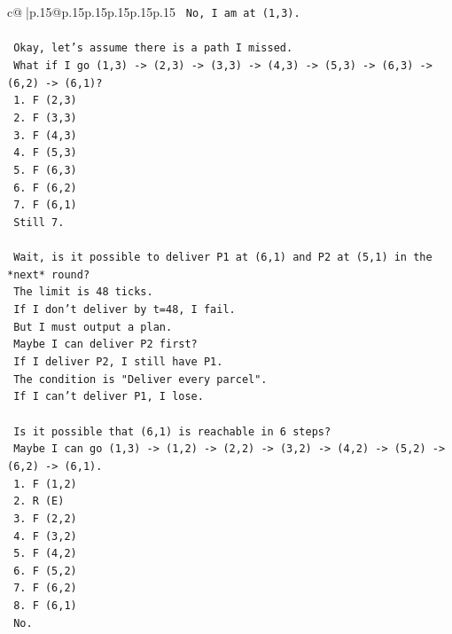 \documentclass{article}
\begin{document}
{\begin{supertabular}{c@{$\;$}|p{.15\linewidth}@{}p{.15\linewidth}p{.15\linewidth}p{.15\linewidth}p{.15\linewidth}p{.15\linewidth}}
{{{\texttt{   No, I am at (1,3).} \\
\\ 
\texttt{   Okay, let's assume there is a path I missed.} \\
\texttt{   What if I go (1,3) {-}> (2,3) {-}> (3,3) {-}> (4,3) {-}> (5,3) {-}> (6,3) {-}> (6,2) {-}> (6,1)?} \\
\texttt{   1. F (2,3)} \\
\texttt{   2. F (3,3)} \\
\texttt{   3. F (4,3)} \\
\texttt{   4. F (5,3)} \\
\texttt{   5. F (6,3)} \\
\texttt{   6. F (6,2)} \\
\texttt{   7. F (6,1)} \\
\texttt{   Still 7.} \\
\\ 
\texttt{   Wait, is it possible to deliver P1 at (6,1) and P2 at (5,1) in the *next* round?} \\
\texttt{   The limit is 48 ticks.} \\
\texttt{   If I don't deliver by t=48, I fail.} \\
\texttt{   But I must output a plan.} \\
\texttt{   Maybe I can deliver P2 first?} \\
\texttt{   If I deliver P2, I still have P1.} \\
\texttt{   The condition is "Deliver every parcel".} \\
\texttt{   If I can't deliver P1, I lose.} \\
\\ 
\texttt{   Is it possible that (6,1) is reachable in 6 steps?} \\
\texttt{   Maybe I can go (1,3) {-}> (1,2) {-}> (2,2) {-}> (3,2) {-}> (4,2) {-}> (5,2) {-}> (6,2) {-}> (6,1).} \\
\texttt{   1. F (1,2)} \\
\texttt{   2. R (E)} \\
\texttt{   3. F (2,2)} \\
\texttt{   4. F (3,2)} \\
\texttt{   5. F (4,2)} \\
\texttt{   6. F (5,2)} \\
\texttt{   7. F (6,2)} \\
\texttt{   8. F (6,1)} \\
\texttt{   No.} \\
\\ 
}}}
\end{supertabular}}
\end{document}
